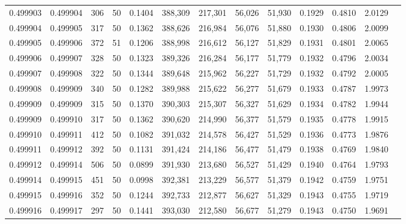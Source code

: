 \begin{tabular}{rrrrrrrrrrrrr}
0.499903 & 0.499904 & 306 &  50 &                                     0.1404 & 388,309 & 217,301 &  56,026 &  51,930 & 0.1929 & 0.4810 & 2.0129 \\
0.499904 & 0.499905 & 317 &  50 &                                     0.1362 & 388,626 & 216,984 &  56,076 &  51,880 & 0.1930 & 0.4806 & 2.0099 \\
0.499905 & 0.499906 & 372 &  51 &                                     0.1206 & 388,998 & 216,612 &  56,127 &  51,829 & 0.1931 & 0.4801 & 2.0065 \\
0.499906 & 0.499907 & 328 &  50 &                                     0.1323 & 389,326 & 216,284 &  56,177 &  51,779 & 0.1932 & 0.4796 & 2.0034 \\
0.499907 & 0.499908 & 322 &  50 &                                     0.1344 & 389,648 & 215,962 &  56,227 &  51,729 & 0.1932 & 0.4792 & 2.0005 \\
0.499908 & 0.499909 & 340 &  50 &                                     0.1282 & 389,988 & 215,622 &  56,277 &  51,679 & 0.1933 & 0.4787 & 1.9973 \\
0.499909 & 0.499909 & 315 &  50 &                                     0.1370 & 390,303 & 215,307 &  56,327 &  51,629 & 0.1934 & 0.4782 & 1.9944 \\
0.499909 & 0.499910 & 317 &  50 &                                     0.1362 & 390,620 & 214,990 &  56,377 &  51,579 & 0.1935 & 0.4778 & 1.9915 \\
0.499910 & 0.499911 & 412 &  50 &                                     0.1082 & 391,032 & 214,578 &  56,427 &  51,529 & 0.1936 & 0.4773 & 1.9876 \\
0.499911 & 0.499912 & 392 &  50 &                                     0.1131 & 391,424 & 214,186 &  56,477 &  51,479 & 0.1938 & 0.4769 & 1.9840 \\
0.499912 & 0.499914 & 506 &  50 &                                     0.0899 & 391,930 & 213,680 &  56,527 &  51,429 & 0.1940 & 0.4764 & 1.9793 \\
0.499914 & 0.499915 & 451 &  50 &                                     0.0998 & 392,381 & 213,229 &  56,577 &  51,379 & 0.1942 & 0.4759 & 1.9751 \\
0.499915 & 0.499916 & 352 &  50 &                                     0.1244 & 392,733 & 212,877 &  56,627 &  51,329 & 0.1943 & 0.4755 & 1.9719 \\
0.499916 & 0.499917 & 297 &  50 &                                     0.1441 & 393,030 & 212,580 &  56,677 &  51,279 & 0.1943 & 0.4750 & 1.9691 \\

\end{tabular}
